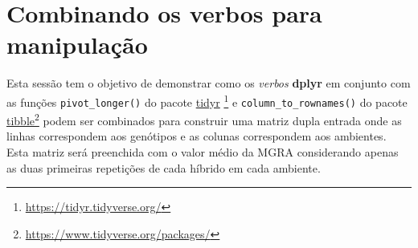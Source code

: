\documentclass[
]{book}
\newenvironment{Shaded}{\begin{snugshade}}{\end{snugshade}}
\newcommand{\CommentTok}[1]{\textcolor[rgb]{0.56,0.35,0.01}{\textit{#1}}}
\newcommand{\DataTypeTok}[1]{\textcolor[rgb]{0.13,0.29,0.53}{#1}}
\newcommand{\DecValTok}[1]{\textcolor[rgb]{0.00,0.00,0.81}{#1}}
\newcommand{\KeywordTok}[1]{\textcolor[rgb]{0.13,0.29,0.53}{\textbf{#1}}}
\newcommand{\NormalTok}[1]{#1}
\newcommand{\OperatorTok}[1]{\textcolor[rgb]{0.81,0.36,0.00}{\textbf{#1}}}
\newcommand{\StringTok}[1]{\textcolor[rgb]{0.31,0.60,0.02}{#1}}
\begin{document}
\hypertarget{combinando-os-verbos-para-manipulauxe7uxe3o}{%
\section{Combinando os verbos para manipulação}\label{combinando-os-verbos-para-manipulauxe7uxe3o}}

Esta sessão tem o objetivo de demonstrar como os \emph{verbos} \textbf{dplyr} em conjunto com as funções \texttt{pivot\_longer()} do pacote \href{https://tidyr.tidyverse.org/}{tidyr} \footnote{\url{https://tidyr.tidyverse.org/}} e \texttt{column\_to\_rownames()}  do pacote \href{https://www.tidyverse.org/packages/}{tibble}\footnote{\url{https://www.tidyverse.org/packages/}} podem ser combinados para construir uma matriz dupla entrada onde as linhas correspondem aos genótipos e as colunas correspondem aos ambientes. Esta matriz será preenchida com o valor médio da MGRA considerando apenas as duas primeiras repetições de cada híbrido em cada ambiente.

\begin{Shaded}
\end{Shaded}
\end{document}
